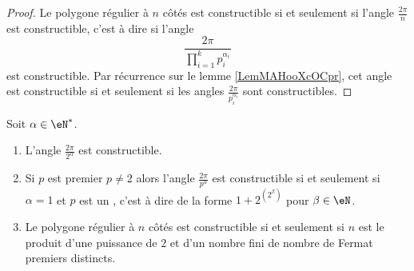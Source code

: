 \begin{proof}
    Le polygone régulier à \( n\) côtés est constructible si et seulement si l'angle \( \frac{ 2\pi }{ n }\) est constructible, c'est à dire si l'angle
    \begin{equation}
        \frac{ 2\pi }{ \prod_{i=1}^kp_i^{\alpha_i} }
    \end{equation}
    est constructible. Par récurrence sur le lemme \ref{LemMAHooXcOCpr}, cet angle est constructible si et seulement si les angles \( \frac{ 2\pi }{ p_i^{\alpha_i} }\) sont constructibles.
\end{proof}

\begin{theorem}    \label{ThoTWAooEsLjJu}
    Soit \( \alpha\in \eN^*\).
    \begin{enumerate}
        \item   \label{ItemFSEooONDFrSi}
            L'angle \( \frac{ 2\pi }{ 2^{\alpha} } \) est constructible.
        \item\label{ItemFSEooONDFrSii}
            Si \( p\) est premier \( p\neq 2\) alors l'angle \( \frac{ 2\pi }{ p^{\alpha} } \) est constructible si et seulement si \( \alpha=1\) et \( p\) est un , c'est à dire de la forme \( 1+2^{(2^{\beta})}\) pour \( \beta\in \eN\).
        \item\label{ItemFSEooONDFrSiii}
            Le polygone régulier à \( n\) côtés est constructible si et seulement si \( n \) est le produit d'une puissance de \( 2\) et d'un nombre fini de nombre de Fermat premiers distincts.
    \end{enumerate}
\end{theorem}

